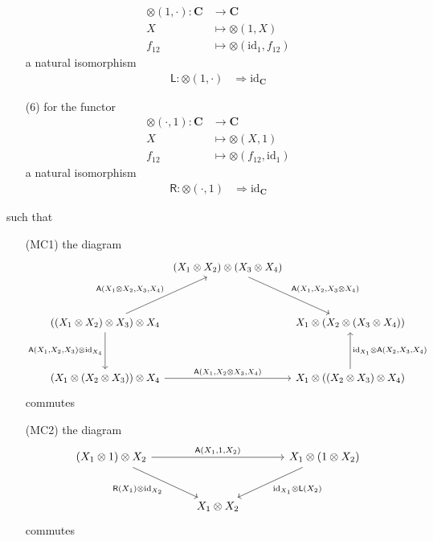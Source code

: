 \begin{enumerate}
\begin{align*}
  \otimes(1,\cdot)
  \colon
  \mathbf{C}
  &\rightarrow
  \mathbf{C}
  \\
  X
  &\mapsto
  \otimes(1,X)
  \\
  f_{12}
  &\mapsto
  \otimes(\mathrm{id}_{1},f_{12})
\end{align*}
a natural isomorphism
\begin{align*}
  \mathsf{L}
  \colon
  \otimes(1,\cdot)
  &\Rightarrow
  \mathrm{id}_{\mathbf{C}}
\end{align*}
\item[(6)]
for the functor
\begin{align*}
  \otimes(\cdot,1)
  \colon
  \mathbf{C}
  &\rightarrow
  \mathbf{C}
  \\
  X
  &\mapsto
  \otimes(X,1)
  \\
  f_{12}
  &\mapsto
  \otimes(f_{12},\mathrm{id}_{1})
\end{align*}
a natural isomorphism
\begin{align*}
  \mathsf{R}
  \colon
  \otimes(\cdot,1)
  &\Rightarrow
  \mathrm{id}_{\mathbf{C}}
\end{align*}
\end{enumerate}
such that
\begin{enumerate}
\item[(MC1)]
the diagram
\begin{equation*}
\begin{tikzcd}[row sep=3.5em,column sep=0.4em]
  &
  (X_{1} \otimes X_{2})
  \otimes
  (X_{3} \otimes X_{4})
  \arrow{dr}{\mathsf{A}(X_{1},X_{2},X_{3} \otimes X_{4})}
  &
  \\
  \left(
    (X_{1} \otimes X_{2})
    \otimes
    X_{3}
  \right)
  \otimes
  X_{4}
  \arrow{ur}{\mathsf{A}(X_{1} \otimes X_{2},X_{3},X_{4})}
  \arrow[swap]{d}{\mathsf{A}(X_{1},X_{2},X_{3}) \otimes \mathrm{id}_{X_{4}}}
  &
  &
  X_{1}
  \otimes
  \left(
    X_{2}
    \otimes
    (X_{3} \otimes X_{4})
  \right)
  \\
  \left(
    X_{1}
    \otimes
    (X_{2} \otimes X_{3})
  \right)
  \otimes
  X_{4}
  \arrow{rr}{\mathsf{A}(X_{1},X_{2} \otimes X_{3},X_{4})}
  &
  &
  X_{1}
  \otimes
  \left(
    (X_{2} \otimes X_{3})
    \otimes
    X_{4}
  \right)
  \arrow[swap]{u}{\mathrm{id}_{X_{1}} \otimes \mathsf{A}(X_{2},X_{3},X_{4})}
\end{tikzcd}
\end{equation*}
commutes
\item[(MC2)]
the diagram
\begin{equation*}
\begin{tikzcd}[sep=large]
  (X_{1} \otimes 1)
  \otimes
  X_{2}
  \arrow{rr}{\mathsf{A}(X_{1},1,X_{2})}
  \arrow[swap]{dr}{\mathsf{R}(X_{1}) \otimes \mathrm{id}_{X_{2}}}
  &
  &
  X_{1}
  \otimes
  (1 \otimes X_{2})
  \arrow{dl}{\mathrm{id}_{X_{1}} \otimes \mathsf{L}(X_{2})}
  \\
  &
  X_{1}
  \otimes
  X_{2}
  &
\end{tikzcd}
\end{equation*}
commutes
\end{enumerate}
